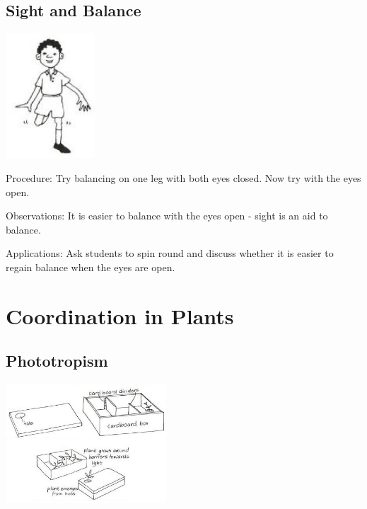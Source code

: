 \begin{multicols}{2}
\subsection{Sight and Balance}

\begin{center}
\includegraphics[width=0.25\textwidth]{./img/vso/sight-balance.jpg}
\end{center}

\begin{description*}
\item[Procedure:]{Try balancing on one leg with
both eyes closed. Now try with
the eyes open. }
\item[Observations:]{It is easier to
balance with the eyes open -
sight is an aid to balance.}
\item[Applications:]{Ask students to spin round and
discuss whether it is easier to
regain balance when the eyes are
open.}
\end{description*}


\section*{Coordination in Plants}


\subsection{Phototropism}

\begin{center}
\includegraphics[width=0.45\textwidth]{./img/vso/phototropism.jpg}
\end{center}


\end{multicols}
